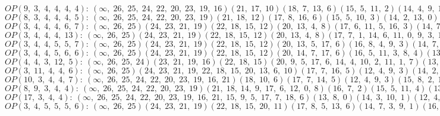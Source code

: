 $OP(9, \;3, \;4, \;4, \;4, \;4): \:(\infty, \;26, \;25, \;24, \;22, \;20, \;23, \;19, \;16)(21, \;17, \;10)(18, \;7, \;13, \;6)(15, \;5, \;11, \;2)(14, \;4, \;9, \;1)(12, \;3, \;8, \;0)$\\
$OP(8, \;3, \;4, \;4, \;4, \;5): \:(\infty, \;26, \;25, \;24, \;22, \;20, \;23, \;19)(21, \;18, \;12)(17, \;8, \;16, \;6)(15, \;5, \;10, \;3)(14, \;2, \;13, \;0)(11, \;7, \;1, \;9, \;4)$\\
$OP(3, \;4, \;4, \;4, \;6, \;7): \:(\infty, \;26, \;25)(24, \;23, \;21, \;19)(22, \;18, \;15, \;12)(20, \;13, \;4, \;8)(17, \;6, \;11, \;5, \;16, \;3)(14, \;7, \;1, \;9, \;0, \;10, \;2)$\\
$OP(3, \;4, \;4, \;4, \;13): \:(\infty, \;26, \;25)(24, \;23, \;21, \;19)(22, \;18, \;15, \;12)(20, \;13, \;4, \;8)(17, \;7, \;1, \;14, \;6, \;11, \;0, \;9, \;3, \;10, \;2, \;16, \;5)$\\
$OP(3, \;4, \;4, \;5, \;5, \;7): \:(\infty, \;26, \;25)(24, \;23, \;21, \;19)(22, \;18, \;15, \;12)(20, \;13, \;5, \;17, \;6)(16, \;8, \;4, \;9, \;3)(14, \;7, \;1, \;10, \;0, \;11, \;2)$\\
$OP(3, \;4, \;4, \;5, \;6, \;6): \:(\infty, \;26, \;25)(24, \;23, \;21, \;19)(22, \;18, \;15, \;12)(20, \;14, \;7, \;17, \;6)(16, \;5, \;11, \;3, \;8, \;4)(13, \;1, \;10, \;2, \;9, \;0)$\\
$OP(4, \;4, \;3, \;12, \;5): \:(\infty, \;26, \;25, \;24)(23, \;21, \;19, \;16)(22, \;18, \;15)(20, \;9, \;5, \;17, \;6, \;14, \;4, \;10, \;2, \;11, \;1, \;7)(13, \;8, \;3, \;12, \;0)$\\
$OP(3, \;11, \;4, \;4, \;6): \:(\infty, \;26, \;25)(24, \;23, \;21, \;19, \;22, \;18, \;15, \;20, \;13, \;6, \;10)(17, \;7, \;16, \;5)(12, \;4, \;9, \;3)(14, \;2, \;8, \;0, \;11, \;1)$\\
$OP(10, \;3, \;4, \;4, \;7): \:(\infty, \;26, \;25, \;24, \;22, \;20, \;23, \;19, \;16, \;21)(18, \;10, \;6)(17, \;7, \;14, \;5)(12, \;4, \;9, \;3)(15, \;8, \;2, \;13, \;0, \;11, \;1)$\\
$OP(8, \;9, \;3, \;4, \;4): \:(\infty, \;26, \;25, \;24, \;22, \;20, \;23, \;19)(21, \;18, \;14, \;9, \;17, \;6, \;12, \;0, \;8)(16, \;7, \;2)(15, \;5, \;11, \;4)(13, \;3, \;10, \;1)$\\
$OP(17, \;3, \;4, \;4): \:(\infty, \;26, \;25, \;24, \;22, \;20, \;23, \;19, \;16, \;21, \;15, \;9, \;5, \;17, \;7, \;18, \;6)(13, \;8, \;0)(14, \;3, \;10, \;1)(12, \;4, \;11, \;2)$\\
$OP(3, \;4, \;5, \;5, \;5, \;6): \:(\infty, \;26, \;25)(24, \;23, \;21, \;19)(22, \;18, \;15, \;20, \;11)(17, \;8, \;5, \;13, \;6)(14, \;7, \;3, \;9, \;1)(16, \;4, \;10, \;0, \;12, \;2)$\\
